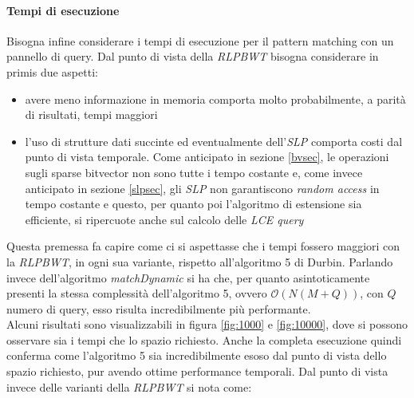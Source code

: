 \paragraph{Tempi di esecuzione}
Bisogna infine considerare i tempi di esecuzione per il pattern matching con un
pannello di query. Dal punto di vista della \textit{RLPBWT} bisogna considerare
in primis due aspetti:
\begin{itemize}
  \item avere meno informazione in memoria comporta molto probabilmente, a
  parità di risultati, tempi maggiori
  \item l'uso di strutture dati succinte ed eventualmente dell'\textit{SLP}
  comporta costi dal punto di vista temporale. Come anticipato in sezione
  \ref{bvsec}, le operazioni sugli sparse bitvector non sono tutte i tempo
  costante e, come invece anticipato in sezione \ref{slpsec}, gli \textit{SLP}
  non garantiscono \textit{random access} in tempo costante e questo, per quanto
  poi l'algoritmo di estensione sia efficiente, si ripercuote anche sul calcolo
  delle \textit{LCE query}
\end{itemize}
Questa premessa fa capire come ci si aspettasse che i tempi fossero maggiori con
la \textit{RLPBWT}, in ogni sua variante, rispetto all'algoritmo 5 di Durbin.
Parlando invece dell'algoritmo \textit{matchDynamic} si ha che, per quanto
asintoticamente presenti la stessa complessità dell'algoritmo 5, ovvero
$\mathcal{O}(N(M+Q))$, con $Q$ numero di query, esso risulta incredibilmente più
performante. \\
Alcuni risultati sono visualizzabili in figura \ref{fig:1000} e \ref{fig:10000},
dove si possono osservare sia i tempi che lo spazio richiesto. Anche la completa
esecuzione quindi conferma come l'algoritmo 5 sia incredibilmente esoso dal
punto di vista dello spazio richiesto, pur avendo ottime performance
temporali. Dal punto di vista invece delle varianti della \textit{RLPBWT} si
nota come:
